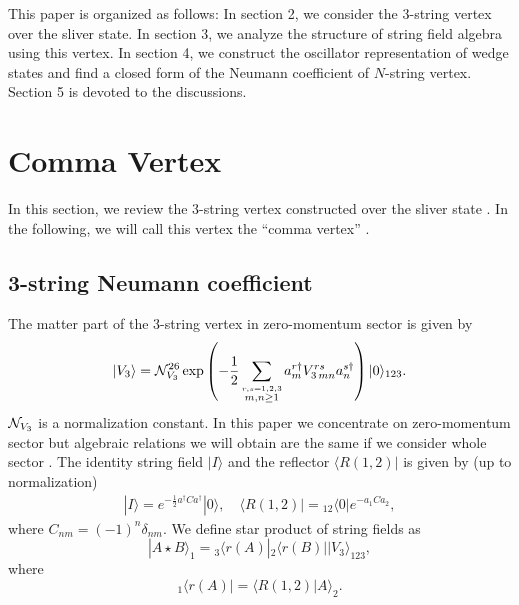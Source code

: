 \documentclass[a4paper,12pt]{article}
\def\cob{\delta}
\def\hf{{1\over 2}}
\def\bra{\langle}
\def\ket{\rangle}
\def\lf{\left}
\def\ri{\right}
\def\st{\star}
\begin{document}
This paper is organized as follows: In section 2, we consider the 3-string
vertex over the sliver state. In section 3, we analyze the structure 
of string field algebra using this vertex. In section 4, we construct the
oscillator representation of wedge states and find a closed form of 
the Neumann coefficient of $N$-string vertex. Section 5 is devoted to 
the discussions.



\section{Comma Vertex}
In this section, we review the 3-string vertex constructed over the
sliver state \cite{KosteleckyPotting}. In the following,
we will call this vertex the ``comma vertex'' 
\cite{Bordes,Abdurrahman,ChanTsou}.  

\subsection{3-string Neumann coefficient}


The matter part of the 
3-string vertex in zero-momentum sector is given by
\cite{GrossJevicki,Samuel,Cremmer}
\begin{equation}
 |V_3\ket={\cal N}_{V_3}^{26}
\exp\lf(-\hf\sum_{\stackrel{r,s=1,2,3}{m,n\geq 1}} 
a^{r\dagger}_m V_{3\,mn}^{rs} a_n^{s\dagger} \ri)
|0\ket_{123}.
\end{equation}
${\cal N}_{V_3}$ is a normalization constant.
In this paper we concentrate
on zero-momentum sector 
but algebraic relations we will obtain are the same
if we consider whole sector
\cite{KosteleckyPotting,RSZ1,GrossTaylor}.
The identity string field $|I\ket $ and the reflector $\bra R(1,2) |$
is given by (up to normalization)
\begin{eqnarray}
 \label{IRa}
|I\ket = e^{-\frac{1}{2} a^{\dagger}Ca^{\dagger}} |0\ket, \quad
\bra R(1,2)| =
{}_{12}\bra 0 | e^{-a_1Ca_2},
\end{eqnarray}
where $C_{nm}=(-1)^n\cob_{nm}$.
We define star product of string fields as 
\begin{equation}
 |A\st B\ket_1={}_3\bra r(A)|{}_2\bra r(B)||V_3\ket_{123},
\end{equation}
where
\begin{equation}
 {}_1\bra r(A)|=\bra R(1,2)|A\ket_2.
\end{equation}
\end{document}

